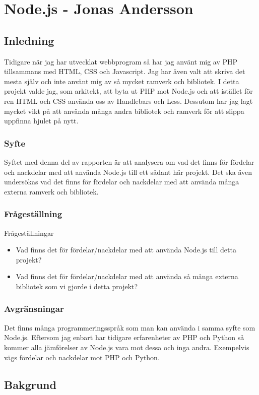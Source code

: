 \section{Node.js - Jonas Andersson}
\subsection{Inledning} 

Tidigare när jag har utvecklat webbprogram så har jag använt mig av PHP tillsammans med HTML, CSS och Javascript. Jag har även valt att skriva det mesta själv och inte använt mig av så mycket ramverk och bibliotek. I detta projekt valde jag, som arkitekt, att byta ut PHP mot Node.js och att istället för ren HTML och CSS använda oss av Handlebars och Less. Dessutom har jag lagt mycket vikt på att använda många andra bibliotek och ramverk för att slippa uppfinna hjulet på nytt.

\subsubsection{Syfte}

Syftet med denna del av rapporten är att analysera om vad det finns för fördelar och nackdelar med att använda Node.js till ett sådant här projekt. Det ska även undersökas vad det finns för fördelar och nackdelar med att använda många externa ramverk och bibliotek.

\subsubsection{Frågeställning}
Frågeställningar
\begin{itemize}
	\item Vad finns det för fördelar/nackdelar med att använda Node.js till detta projekt?
	\item Vad finns det för fördelar/nackdelar med att använda så många externa bibliotek som vi gjorde i detta projekt?
\end{itemize}
\subsubsection{Avgränsningar}
Det finns många programmeringsspråk som man kan använda i samma syfte som Node.js. Eftersom jag enbart har tidigare erfarenheter av PHP och Python så kommer alla jämförelser av Node.js vara mot dessa och inga andra. Exempelvis vägs fördelar och nackdelar mot PHP och Python.
\subsection{Bakgrund}

